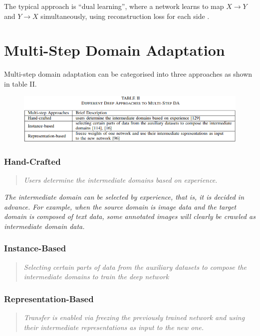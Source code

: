 \documentclass{report}
\newcommand{\quoteit}[1]{\begin{quote}\textit{#1}\end{quote}}
\begin{document}
The typical approach is ``dual learning'', where a network learns to map $X\rightarrow Y$ and $Y\rightarrow X$ simultaneously, using reconstruction loss for each side \parencite{duallearning}\parencite{unpairedimagetoimage}.



\setcounter{chapter}{2}
\chapter*{Multi-Step Domain Adaptation}
Multi-step domain adaptation can be categorised into three approaches as shown in table II.
\begin{figure}[!h]
	\centering
	\includegraphics[width=14cm]{two-step-approaches}
	\label{fig:two-step-approaches:1}
\end{figure}
\subsection{Hand-Crafted}
\quoteit{Users determine the intermediate domains based on experience.}
\textit{The intermediate domain can be selected by experience, that is, it is decided in advance. For example, when the source domain is image data and the target domain is composed of text data, some annotated images will clearly be crawled as intermediate domain data.}

\subsection{Instance-Based}
\quoteit{Selecting certain parts of data from the auxiliary datasets to compose the intermediate domains to train the deep network}


\subsection{Representation-Based}
\quoteit{Transfer is enabled via freezing the previously trained network and using their intermediate representations as input to the new one.}
\end{document}
